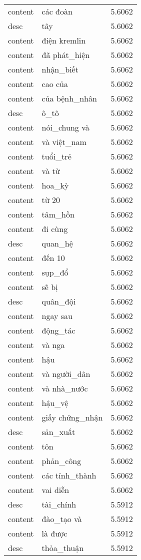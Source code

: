 \documentclass{article}
\begin{document}
\begin{tabular}{lll}
content & các đoàn & 5.6062\\
desc & tây & 5.6062\\
content & điện kremlin & 5.6062\\
content & đã phát\_hiện & 5.6062\\
content & nhận\_biết & 5.6062\\
content & cao của & 5.6062\\
content & của bệnh\_nhân & 5.6062\\
desc & ô\_tô & 5.6062\\
content & nói\_chung và & 5.6062\\
content & và việt\_nam & 5.6062\\
content & tuổi\_trẻ & 5.6062\\
content & và từ & 5.6062\\
content & hoa\_kỳ & 5.6062\\
content & từ 20 & 5.6062\\
content & tâm\_hồn & 5.6062\\
content & đi cùng & 5.6062\\
desc & quan\_hệ & 5.6062\\
content & đến 10 & 5.6062\\
content & sụp\_đổ & 5.6062\\
content & sẽ bị & 5.6062\\
desc & quân\_đội & 5.6062\\
content & ngay sau & 5.6062\\
content & động\_tác & 5.6062\\
content & và nga & 5.6062\\
content & hậu & 5.6062\\
content & và người\_dân & 5.6062\\
content & và nhà\_nước & 5.6062\\
content & hậu\_vệ & 5.6062\\
content & giấy chứng\_nhận & 5.6062\\
desc & sản\_xuất & 5.6062\\
content & tôn & 5.6062\\
content & phản\_công & 5.6062\\
content & các tỉnh\_thành & 5.6062\\
content & vai diễn & 5.6062\\
desc & tài\_chính & 5.5912\\
content & đào\_tạo và & 5.5912\\
content & là được & 5.5912\\
desc & thỏa\_thuận & 5.5912\\

\end{tabular}
\end{document}

